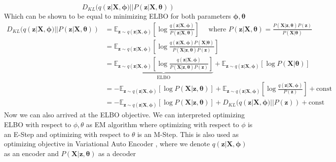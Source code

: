 \begin{equation}
    D_{KL}(q(\boldsymbol{z}| \boldsymbol{X}, \boldsymbol{\phi}) || P( \boldsymbol{z} |\boldsymbol{X} , \boldsymbol{\theta}) )
\end{equation}
Which can be shown to be equal to minimizing ELBO for both parameters $\boldsymbol{\phi}, \boldsymbol{\theta}$
\begin{equation}
    \begin{aligned}
        D_{KL}(q(\boldsymbol{z}| \boldsymbol{X}, \boldsymbol{\phi}) || P( \boldsymbol{z} |\boldsymbol{X} , \boldsymbol{\theta}) ) &= \mathbb{E}_{\boldsymbol{z} \sim q(\boldsymbol{z} | \boldsymbol{X}, \boldsymbol{\phi})} \left[ \log \frac{q(\boldsymbol{z} | \boldsymbol{X}, \boldsymbol{\phi})}{P(\boldsymbol{z} | \boldsymbol{X}, \boldsymbol{\theta})} \right] \quad \text{ where } P(\boldsymbol{z} | \boldsymbol{X}, \boldsymbol{\theta}) = \frac{P(\boldsymbol{X} | \boldsymbol{z}, \boldsymbol{\theta}) P(\boldsymbol{z})}{P(\boldsymbol{X} | \boldsymbol{\theta})} \\ 
        &= \mathbb{E}_{\boldsymbol{z} \sim q(\boldsymbol{z} | \boldsymbol{X}, \boldsymbol{\phi})} \left[ \log \frac{q(\boldsymbol{z} | \boldsymbol{X}, \boldsymbol{\phi}) P(\boldsymbol{X} | \boldsymbol{\theta})}{P(\boldsymbol{X} | \boldsymbol{z}, \boldsymbol{\theta}) P(\boldsymbol{z})} \right] \\ 
        &= \underbrace{\mathbb{E}_{\boldsymbol{z} \sim q(\boldsymbol{z} | \boldsymbol{X}, \boldsymbol{\phi})} \left[ \log \frac{q(\boldsymbol{z} | \boldsymbol{X}, \boldsymbol{\phi})}{P(\boldsymbol{X} | \boldsymbol{z}, \boldsymbol{\theta}) P(\boldsymbol{z})} \right]}_{\text{ELBO}} + \mathbb{E}_{\boldsymbol{z} \sim q(\boldsymbol{z} | \boldsymbol{X}, \boldsymbol{\phi})} \left[ \log P(\boldsymbol{X} | \boldsymbol{\theta}) \right]  \\ 
        &= -\mathbb{E}_{\boldsymbol{z} \sim q(\boldsymbol{z} | \boldsymbol{X}, \boldsymbol{\phi})} \left[ \log P(\boldsymbol{X} | \boldsymbol{z}, \boldsymbol{\theta}) \right] + \mathbb{E}_{\boldsymbol{z} \sim q(\boldsymbol{z} | \boldsymbol{X}, \boldsymbol{\phi})} \left[ \log \frac{q(\boldsymbol{z} | \boldsymbol{X}, \boldsymbol{\phi})}{P(\boldsymbol{z})} \right] + \text{const} \\ 
        &= -\mathbb{E}_{\boldsymbol{z} \sim q(\boldsymbol{z} | \boldsymbol{X}, \boldsymbol{\phi})} \left[ \log P(\boldsymbol{X} | \boldsymbol{z}, \boldsymbol{\theta}) \right] + D_{KL}(q(\boldsymbol{z} | \boldsymbol{X}, \boldsymbol{\phi}) || P(\boldsymbol{z})) + \text{const}
    \end{aligned}
\end{equation}
Now we can also arrived at the ELBO objective. We can interpreted optimizing ELBO with respect to $\phi, \theta$ as EM algorithm where optimizing with respect to $\phi$ is an E-Step and optimizing with respect to $\theta$ is an M-Step. This is also used as optimizing objective in Variational Auto Encoder \cite{kingma2013auto}, where we denote $q(\boldsymbol{z} | \boldsymbol{X}, \boldsymbol{\phi})$ as an encoder and $P(\boldsymbol{X} | \boldsymbol{z}, \boldsymbol{\theta})$ as a decoder




